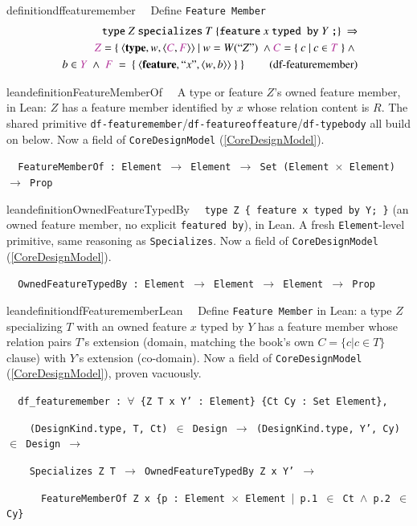 \begin{restatable}{definition}{dffeaturemember}~~   Define \texttt{Feature Member}
\begin{align}
\texttt{type}~ Z~\texttt{specializes}~T~\{ \texttt{feature}~ x ~\texttt{typed by}~ Y~\texttt{;} \}~\Rightarrow  \notag \\
\mc{Z}=\{~\langle \textbf{type},w,\langle \mc{C},\mc{F}\rangle\rangle ~\vert~
w=W(``Z")~ \wedge
\mc{C}=\{~c~\vert ~c \in \mc{T}~\}~\wedge~\notag \\
~b\in \mc{Y}~\wedge~\mc{F}~=~\{~\langle\textbf{feature},``x",\langle w,b \rangle\rangle~\}~\}~\label{eq:df-featuremember}\tag{df-featuremember}
\end{align}
\end{restatable}

\begin{restatable}{leandefinition}{FeatureMemberOf}~~ A type or feature $Z$'s owned
feature member, in Lean: $Z$ has a feature member identified by $x$ whose relation content is $R$. The shared
primitive \texttt{df-featuremember}/\texttt{df-featureoffeature}/\texttt{df-typebody} all build on below.
Now a field of \texttt{CoreDesignModel} (\ref{CoreDesignModel}).

\texttt{~~FeatureMemberOf : Element $\to$ Element $\to$ Set (Element $\times$ Element) $\to$ Prop}
\label{FeatureMemberOf}
\end{restatable}

\begin{restatable}{leandefinition}{OwnedFeatureTypedBy}~~ \texttt{type Z \{ feature x
typed by Y; \}} (an owned feature member, no explicit \texttt{featured by}), in Lean. A fresh
\texttt{Element}-level primitive, same reasoning as \texttt{Specializes}. Now a field of
\texttt{CoreDesignModel} (\ref{CoreDesignModel}).

\texttt{~~OwnedFeatureTypedBy : Element $\to$ Element $\to$ Element $\to$ Prop}
\label{OwnedFeatureTypedBy}
\end{restatable}

\begin{restatable}{leandefinition}{dfFeaturememberLean}~~ Define \texttt{Feature
Member} in Lean: a type $Z$ specializing $T$ with an owned feature $x$ typed by $Y$ has a feature member whose
relation pairs $T$'s extension (domain, matching the book's own $C=\{c \vert c\in T\}$ clause) with $Y$'s
extension (co-domain). Now a field of \texttt{CoreDesignModel} (\ref{CoreDesignModel}), proven vacuously.

\texttt{~~df\_featuremember : $\forall$ \{Z T x Y' : Element\} \{Ct Cy : Set Element\},}

\texttt{~~~~(DesignKind.type, T, Ct) $\in$ Design $\to$ (DesignKind.type, Y', Cy) $\in$ Design $\to$}

\texttt{~~~~Specializes Z T $\to$ OwnedFeatureTypedBy Z x Y' $\to$}

\texttt{~~~~~~FeatureMemberOf Z x \{p : Element $\times$ Element $\vert$ p.1 $\in$ Ct $\wedge$ p.2 $\in$ Cy\}}
\label{df_featuremember}
\end{restatable}

